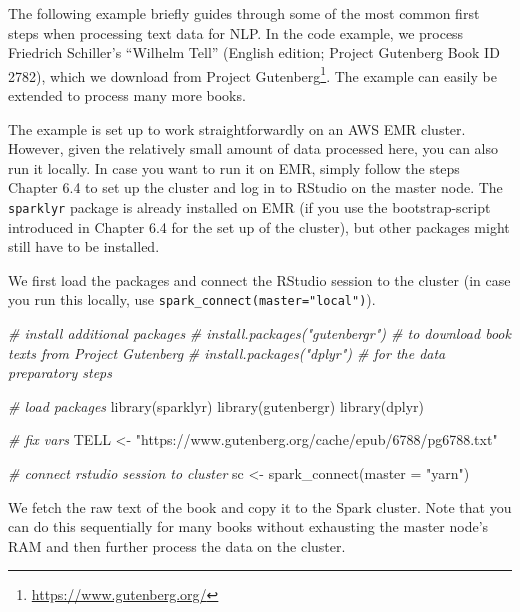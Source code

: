 \documentclass[
  12pt,
]{style/krantz}
\newenvironment{Shaded}{\begin{snugshade}}{\end{snugshade}}
\newcommand{\AttributeTok}[1]{\textcolor[rgb]{0.77,0.63,0.00}{#1}}
\newcommand{\CommentTok}[1]{\textcolor[rgb]{0.56,0.35,0.01}{\textit{#1}}}
\newcommand{\FunctionTok}[1]{\textcolor[rgb]{0.00,0.00,0.00}{#1}}
\newcommand{\NormalTok}[1]{#1}
\newcommand{\OtherTok}[1]{\textcolor[rgb]{0.56,0.35,0.01}{#1}}
\newcommand{\StringTok}[1]{\textcolor[rgb]{0.31,0.60,0.02}{#1}}
\renewcommand{\href}[2]{#2\footnote{\url{#1}}}
\begin{document}
The following example briefly guides through some of the most common first steps when processing text data for NLP. In the code example, we process Friedrich Schiller's ``Wilhelm Tell'' (English edition; Project Gutenberg Book ID 2782), which we download from \href{https://www.gutenberg.org/}{Project Gutenberg}. The example can easily be extended to process many more books.

The example is set up to work straightforwardly on an AWS EMR cluster. However, given the relatively small amount of data processed here, you can also run it locally. In case you want to run it on EMR, simply follow the steps Chapter 6.4 to set up the cluster and log in to RStudio on the master node. The \texttt{sparklyr} package is already installed on EMR (if you use the bootstrap-script introduced in Chapter 6.4 for the set up of the cluster), but other packages might still have to be installed.

We first load the packages and connect the RStudio session to the cluster (in case you run this locally, use \texttt{spark\_connect(master="local")}).

\begin{Shaded}
\begin{Highlighting}[]
\CommentTok{\# install additional packages}
\CommentTok{\# install.packages("gutenbergr") \# to download book texts from Project Gutenberg}
\CommentTok{\# install.packages("dplyr") \# for the data preparatory steps}

\CommentTok{\# load packages}
\FunctionTok{library}\NormalTok{(sparklyr)}
\FunctionTok{library}\NormalTok{(gutenbergr)}
\FunctionTok{library}\NormalTok{(dplyr)}

\CommentTok{\# fix vars}
\NormalTok{TELL }\OtherTok{\textless{}{-}} \StringTok{"https://www.gutenberg.org/cache/epub/6788/pg6788.txt"}


\CommentTok{\# connect rstudio session to cluster}
\NormalTok{sc }\OtherTok{\textless{}{-}} \FunctionTok{spark\_connect}\NormalTok{(}\AttributeTok{master =} \StringTok{"yarn"}\NormalTok{)}
\end{Highlighting}
\end{Shaded}

We fetch the raw text of the book and copy it to the Spark cluster. Note that you can do this sequentially for many books without exhausting the master node's RAM and then further process the data on the cluster.
\end{document}
